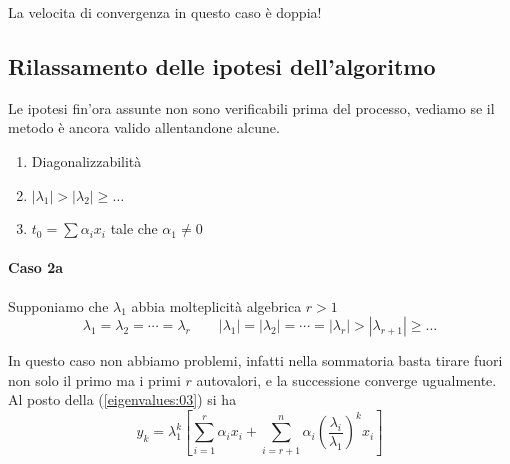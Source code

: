 La velocita di convergenza in questo caso \`e doppia!


\subsection{Rilassamento delle ipotesi dell'algoritmo}
Le ipotesi fin'ora assunte non sono verificabili prima del processo,
vediamo se il metodo è ancora valido allentandone alcune.
\begin{enumerate}
\item Diagonalizzabilit\`a
\item $|\lambda_1| > | \lambda_2| \geq \ldots$
\item $ t_0 = \sum \alpha_i x_i$ tale che $\alpha_1 \neq 0$
\end{enumerate}

\paragraph{Caso 2a}
Supponiamo che $\lambda_1$ abbia molteplicit\`a algebrica $r>1$
$$ \lambda_1 = \lambda_2 = \cdots = \lambda_r \qquad 
  |\lambda_1| = |\lambda_2 | = \cdots = |\lambda_r| > |\lambda_{r+1}| \geq \ldots $$

In questo caso non abbiamo problemi, infatti nella sommatoria basta
tirare fuori non solo il primo ma i primi $r$ autovalori, e la successione
converge ugualmente.\\
Al posto della (\ref{eigenvalues:03}) si ha
$$
y_k =  \lambda_1^{k}
\left[ \displaystyle \sum_{i=1}^{r} \alpha_i x_i +
\sum_{i=r+1}^{n} \alpha_i \left( \dfrac{\lambda_i}{\lambda_1} \right)^{k} x_i
 \right]
$$

